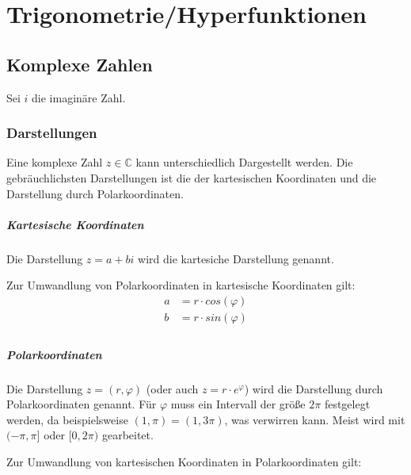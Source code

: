 	\paragraph{}

\chapter{Trigonometrie/Hyperfunktionen}
	\section{Komplexe Zahlen}
		Sei $ i $ die imaginäre Zahl.

		\subsection{Darstellungen}
			Eine komplexe Zahl $ z \in \mathbb{C} $ kann unterschiedlich Dargestellt werden. Die gebräuchlichsten Darstellungen ist die der kartesischen Koordinaten und die Darstellung durch Polarkoordinaten.

			\paragraph{Kartesische Koordinaten}
				Die Darstellung $ z = a + bi $ wird die kartesiche Darstellung genannt.

				Zur Umwandlung von Polarkoordinaten in kartesische Koordinaten gilt:
				\begin{align*}
					a & = r \cdot cos(\varphi) \\
					b & = r \cdot sin(\varphi) \\
				\end{align*}

			\paragraph{Polarkoordinaten}
				Die Darstellung $ z = (r, \varphi) $ (oder auch $ z = r \cdot e ^ \varphi $) wird die Darstellung durch Polarkoordinaten genannt. Für $ \varphi $ muss ein Intervall der größe $ 2\pi $ festgelegt werden, da beispielsweise $ (1, \pi) = (1, 3\pi) $, was verwirren kann. Meist wird mit $ (-\pi, \pi] $ oder $ [0, 2\pi) $ gearbeitet.

				Zur Umwandlung von kartesischen Koordinaten in Polarkoordinaten gilt:

